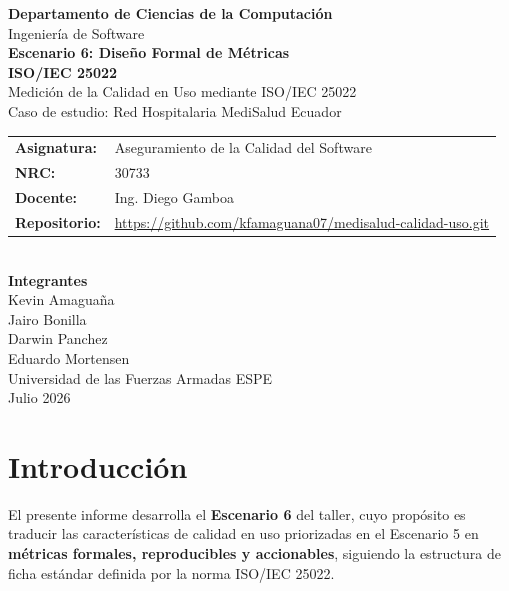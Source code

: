\documentclass[12pt,a4paper]{article}
\begin{document}
\begin{titlepage}
\centering
{\Large \textbf{Departamento de Ciencias de la Computaci\'on}}\\[0.3cm]
{\large Ingenier\'ia de Software}\\[1.5cm]

{\LARGE \textbf{Escenario 6: Dise\~no Formal de M\'etricas\\ISO/IEC 25022}}\\[0.5cm]
{\large Medici\'on de la Calidad en Uso mediante ISO/IEC 25022}\\[0.3cm]
{\large Caso de estudio: Red Hospitalaria MediSalud Ecuador}\\[2cm]

\begin{tabular}{ll}
\textbf{Asignatura:} & Aseguramiento de la Calidad del Software \\
\textbf{NRC:}        & 30733 \\
\textbf{Docente:}    & Ing. Diego Gamboa \\
\textbf{Repositorio:} & \url{https://github.com/kfamaguana07/medisalud-calidad-uso.git} \\
\end{tabular}\\[1.5cm]

\textbf{Integrantes}\\[0.3cm]
Kevin Amagua\~na \\
Jairo Bonilla \\
Darwin Panchez \\
Eduardo Mortensen \\[2cm]

{\large Universidad de las Fuerzas Armadas ESPE}\\[0.3cm]
{\large Julio 2026}
\end{titlepage}

\tableofcontents
\newpage

\section{Introducci\'on}
El presente informe desarrolla el \textbf{Escenario 6} del taller, cuyo prop\'osito es traducir las caracter\'isticas de calidad en uso priorizadas en el Escenario 5 en \textbf{m\'etricas formales, reproducibles y accionables}, siguiendo la estructura de ficha est\'andar definida por la norma ISO/IEC 25022.
\end{document}
